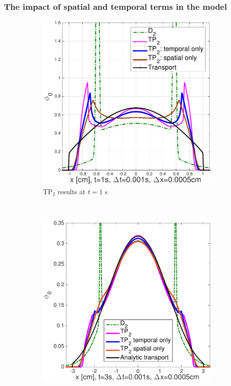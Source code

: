 \documentclass[review]{elsarticle}
\begin{document}
\subsubsection{The impact of spatial and temporal terms in the model}
\begin{figure}[ht!]
	\begin{subfigure}{.5\textwidth}
		\centering
		\hspace*{-1cm}\includegraphics[width=1.\linewidth]{fl3_limiters_1s2.pdf}
		\caption{TP$_2$ results at $t = 1$ s}
		\label{f:fl3limiter}
	\end{subfigure}
	~
	\begin{subfigure}{.5\textwidth}
		\centering
		\includegraphics[width=1.\linewidth]{fl3_limiters_3s.pdf}

\end{subfigure}
\end{figure}
\end{document}
